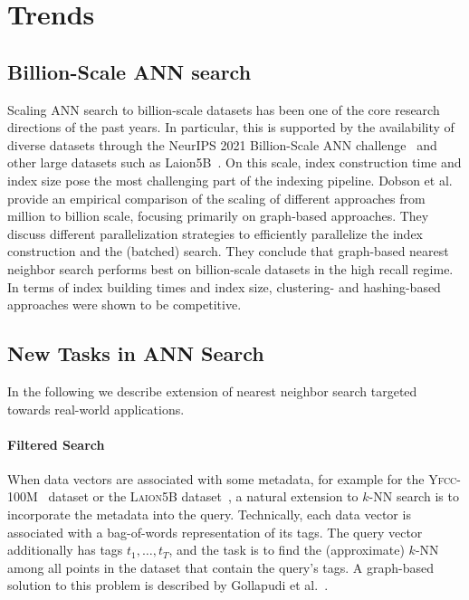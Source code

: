 \documentclass[11pt]{article}
\begin{document}
\section{Trends}
\label{matteo_sec:trends}

\subsection{Billion-Scale ANN search}

Scaling ANN search to billion-scale datasets has been one of the core research directions of the past years.
In particular, this is supported by the availability of diverse datasets through the NeurIPS 2021 Billion-Scale ANN challenge~\cite{DBLP:conf/nips/SimhadriWADBBCH21} and other large datasets such as Laion5B~\cite{DBLP:conf/nips/SchuhmannBVGWCC22}.
On this scale, index construction time and index size pose the most challenging part of the indexing pipeline.
Dobson et al.~\cite{DBLP:journals/corr/abs-2305-04359} provide an empirical comparison of the scaling of different approaches from million to billion scale, focusing primarily on graph-based approaches. They discuss different parallelization strategies to efficiently parallelize the index construction and the (batched) search.
They conclude that graph-based nearest neighbor search performs best on billion-scale datasets in the high recall regime.
In terms of index building times and index size, clustering- and hashing-based approaches were shown to be competitive.

\subsection{New Tasks in ANN Search}

In the following we describe extension of nearest neighbor search targeted towards real-world applications.

\paragraph{Filtered Search} When data vectors are associated with some metadata, for example for the \textsc{Yfcc-100M}~\cite{DBLP:journals/cacm/ThomeeSFENPBL16} dataset or the \textsc{Laion5B} dataset~\cite{DBLP:conf/nips/SchuhmannBVGWCC22}, a natural extension to $k$-NN search is to incorporate the metadata into the query.
Technically, each data vector is associated with a bag-of-words representation of its tags. The query vector additionally has tags $t_1,\ldots,t_T$, and the task is to find the (approximate) $k$-NN among all points in the dataset that contain the query's tags. A graph-based solution to this problem is described by Gollapudi et al.~\cite{DBLP:conf/www/GollapudiKSKBRL23-filter}.
\end{document}

